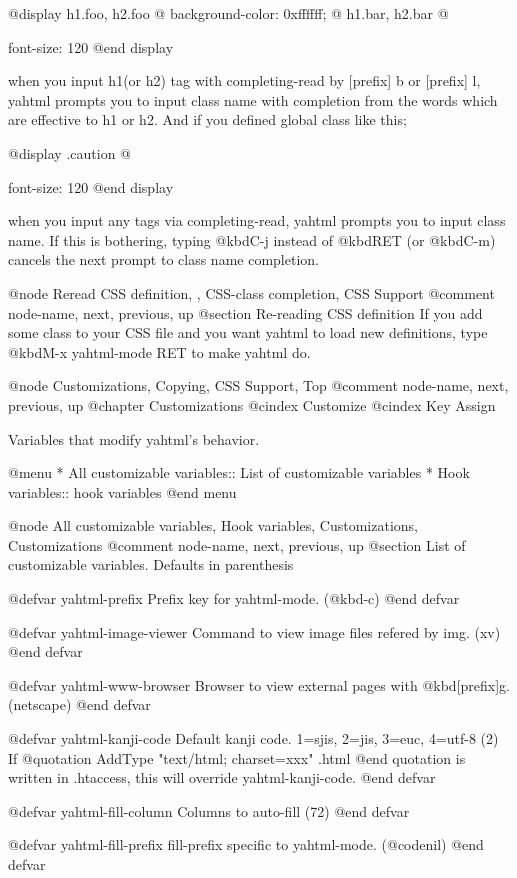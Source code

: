 @display
 h1.foo, h2.foo @{ background-color: 0xffffff; @}
 h1.bar, h2.bar @{ font-size: 120%
@end display

when you input h1(or h2) tag with completing-read by [prefix] b or
[prefix] l, yahtml prompts you to input class name with completion from
the words which are effective to h1 or h2.  And if you defined
global class like this;

@display
 .caution @{ font-size: 120%
@end display

when you input any tags via completing-read, yahtml prompts you to input
class name.  If this is bothering, typing @kbd{C-j} instead of
@kbd{RET} (or @kbd{C-m}) cancels the next prompt to class name completion.

@node Reread CSS definition,  , CSS-class completion, CSS Support
@comment  node-name,  next,  previous,  up
@section Re-reading CSS definition
If you add some class to your CSS file and you want yahtml to load
new definitions, type @kbd{M-x yahtml-mode RET} to make yahtml do.

@node Customizations, Copying, CSS Support, Top
@comment  node-name,  next,  previous,  up
@chapter Customizations
@cindex Customize
@cindex Key Assign

Variables that modify yahtml's behavior.

@menu
* All customizable variables::  List of customizable variables
* Hook variables::              hook variables
@end menu

@node All customizable variables, Hook variables, Customizations, Customizations
@comment  node-name,  next,  previous,  up
@section List of customizable variables.  Defaults in parenthesis

@defvar yahtml-prefix
Prefix key for yahtml-mode.  (@kbd{\C-c})
@end defvar

@defvar yahtml-image-viewer
Command to view image files refered by img. (xv)
@end defvar

@defvar yahtml-www-browser
Browser to view external pages with @kbd{[prefix]g}. (netscape)
@end defvar

@defvar yahtml-kanji-code
Default kanji code. 1=sjis, 2=jis, 3=euc, 4=utf-8 (2)
If
@quotation
 AddType "text/html; charset=xxx" .html
@end quotation
is written in .htaccess, this will override yahtml-kanji-code.
@end defvar

@defvar yahtml-fill-column
Columns to auto-fill (72)
@end defvar

@defvar yahtml-fill-prefix
fill-prefix specific to yahtml-mode. (@code{nil})
@end defvar

}}
